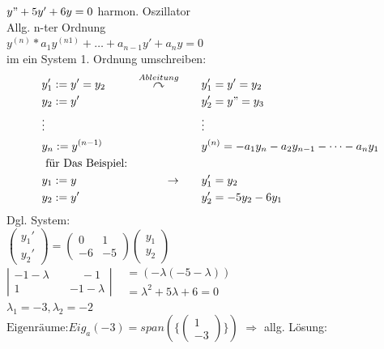  \begin{example}
 	$y"+5y'+6y=0$ harmon. Oszillator\\
 	Allg. n-ter Ordnung \\
 	$y^(n)*a_1y^{(n1)}+\dots+ a_{n-1}y'+a_n y=0$\\
 	im ein System 1. Ordnung umschreiben:\\
\begin{align*}
	&y_1' := y' =y_2   				\quad & \overset{Ableitung}{\curvearrowright} \qquad  &y_1'=y'=y_2 \\
	&y_2:= y' 	  	  		 		 &	\quad		    						   &y_2'=y"=y_3   \\
 	&\vdots  		  		 		 & \quad    									   &\vdots      \\
 	&	y_n:= y^{(n-1)}				 & 	\quad				 		  &y^{(n)}=-a_1y_n-a_2y_{n-1}-\dots -a_n y_1\\
 	&\text{	für Das Beispiel:} 	  	 &	\quad		&\\
&y_1:= y             			 	\quad&\rightarrow \qquad 												&y_1'=y_2\\
&y_2:=y' 					        & \quad								&y_2'= -5y_2-6y_1
\end{align*}
Dgl. System:\\
$\begin{pmatrix}
y_1'\\
y_2'
\end{pmatrix}= \begin{pmatrix}
0   & 1\\
-6  &-5
\end{pmatrix}\begin{pmatrix}
y_1\\
y_2
\end{pmatrix}$\\
$\left| \begin{matrix}
	-1-  \lambda \quad &\quad-1\\
	1			 \quad &-1-\lambda
\end{matrix}\right| \begin{matrix}
					&= (-\lambda (-5-\lambda))\\
					&=\lambda^2 +5 \lambda +6=0
						\end{matrix}$\\
						$\lambda_1 =-3, \lambda_2=-2$\\
			$\text{Eigenräume:} Eig_a(-3)=span(\{ \begin{pmatrix} 1 \\ 
			-3 \end{pmatrix} \})$
		$\Rightarrow $ allg. Lösung:\\

\end{example}
